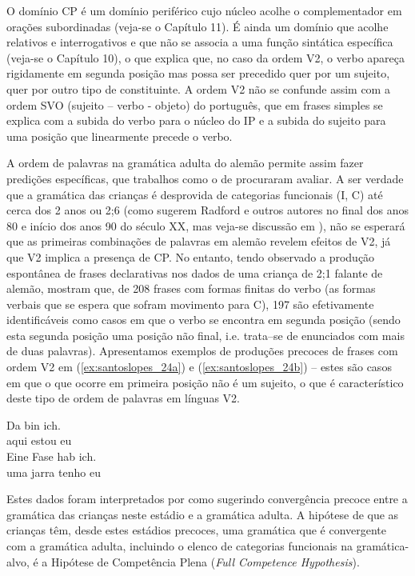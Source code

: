 \documentclass[output=paper]{LSP/langsci}
\begin{document}
O domínio CP é um domínio periférico cujo núcleo acolhe o complementador em orações subordinadas (veja-se o Capítulo 11). É ainda um domínio que acolhe relativos e interrogativos e que não se associa a uma função sintática específica (veja-se o Capítulo 10), o que explica que, no caso da ordem V2, o verbo apareça rigidamente em segunda posição mas possa ser precedido quer por um sujeito, quer por outro tipo de constituinte. A ordem V2 não se confunde assim com a ordem SVO (sujeito – verbo - objeto) do português, que em frases simples se explica com a subida do verbo para o núcleo do IP e a subida do sujeito para uma posição que linearmente precede o verbo.

A ordem de palavras na gramática adulta do alemão permite assim fazer predições específicas, que trabalhos como o de \citet{poeppelwexler1993} procuraram avaliar. A ser verdade que a gramática das crianças é desprovida de categorias funcionais (I, C) até cerca dos 2 anos ou 2;6 (como sugerem Radford e outros autores no final dos anos 80 e início dos anos 90 do século XX, mas veja-se discussão em \citealt{poeppelwexler1993}), não se esperará que as primeiras combinações de palavras em alemão revelem efeitos de V2, já que V2 implica a presença de CP. No entanto, tendo observado a produção espontânea de frases declarativas nos dados de uma criança de 2;1 falante de alemão, \citet[7]{poeppelwexler1993} mostram que, de 208 frases com formas finitas do verbo (as formas verbais que se espera que sofram movimento para C), 197 são efetivamente identificáveis como casos em que o verbo se encontra em segunda posição (sendo esta segunda posição uma posição não final, i.e. trata--se de enunciados com mais de duas palavras). Apresentamos exemplos de produções precoces de frases com ordem V2 em (\ref{ex:santoslopes_24a}) e (\ref{ex:santoslopes_24b}) – estes são casos em que o que ocorre em primeira posição não é um sujeito, o que é característico deste tipo de ordem de palavras em línguas V2.

\ea\label{ex:santoslopes_24}
\ea\label{ex:santoslopes_24a}
\gll Da bin ich.\\
aqui estou eu\\
\ex\label{ex:santoslopes_24b}
\gll Eine Fase hab ich.\\
uma jarra tenho eu\\
\zl

Estes dados foram interpretados por \citeauthor{poeppelwexler1993} como sugerindo convergência precoce entre a gramática das crianças neste estádio e a gramática adulta. A hipótese de que as crianças têm, desde estes estádios precoces, uma gramática que é convergente com a gramática adulta, incluindo o elenco de categorias funcionais na gramática-alvo, é a Hipótese de Competência Plena (\textit{Full Competence Hypothesis}).
\end{document}
